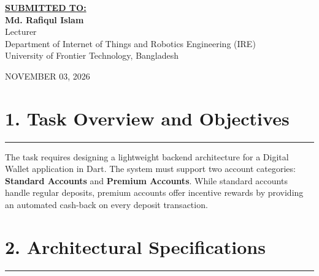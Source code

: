 \documentclass[11pt,a4paper]{article}
\begin{document}
\begin{titlepage}
    {\small \textbf{\underline{SUBMITTED TO:}}}\\[0.22cm]
    {\large \textbf{Md. Rafiqul Islam}}\\[0.14cm]
    {\small Lecturer}\\[0.1cm]
    {\footnotesize Department of Internet of Things and Robotics Engineering (IRE)}\\[0.08cm]
    {\footnotesize University of Frontier Technology, Bangladesh}

    \vfill
    {\footnotesize NOVEMBER 03, 2026}
    \vspace*{0.3cm}
\end{titlepage}

\newpage
{}

\section*{1. Task Overview and Objectives}
\noindent\rule{\textwidth}{0.5pt}\vspace{0.15cm}

The task requires designing a lightweight backend architecture for a Digital Wallet application in Dart. The system must support two account categories: \textbf{Standard Accounts} and \textbf{Premium Accounts}. While standard accounts handle regular deposits, premium accounts offer incentive rewards by providing an automated cash-back on every deposit transaction.

\vspace{0.25cm}
\section*{2. Architectural Specifications}
\noindent\rule{\textwidth}{0.5pt}\vspace{0.15cm}
\end{document}
